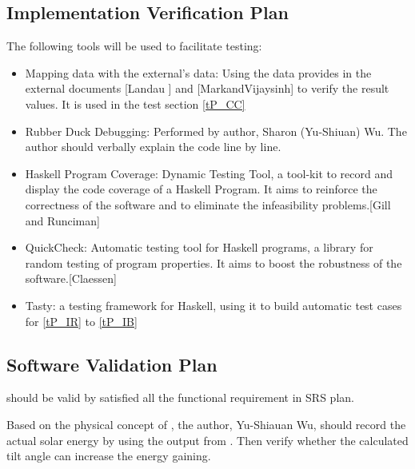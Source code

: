 \documentclass[12pt, titlepage]{article}
\begin{document}



\subsection{Implementation Verification Plan}\label{ImplementVP} 
The following tools will be used to facilitate testing: 

\begin{itemize}
\item Mapping data with the external's data: Using the data provides in the external documents [Landau ] \cite{Charles2001} and [MarkandVijaysinh] \cite{JacobsonandJadhav} to verify the result values. It is used in the test section \ref{tP_CC}

\item Rubber Duck Debugging: Performed by author, Sharon (Yu-Shiuan) Wu. The 
author should verbally explain the code line by line.
\item Haskell Program Coverage: Dynamic Testing Tool, a tool-kit to record 
and display the code coverage of a Haskell Program. It aims to reinforce the 
correctness of the software and to eliminate the infeasibility problems.[Gill
and Runciman] \cite{GillandRunciman}
\item QuickCheck: Automatic testing tool for Haskell programs, a library for
random testing of program properties. It aims to boost the robustness of the 
software.[Claessen] \cite{QuickCheck}
\item Tasty: a testing framework for Haskell, using it to build automatic test cases for \ref{tP_IR} to \ref{tP_IB}
\end{itemize} 

 



\subsection{Software Validation Plan}

\progname{} should be valid by satisfied all the functional requirement in SRS 
plan.

Based on the physical concept of \progname, the author, Yu-Shiauan Wu, should
record the actual solar energy by using the output from \progname. Then verify
whether the calculated tilt angle can increase the energy gaining.
\end{document}
